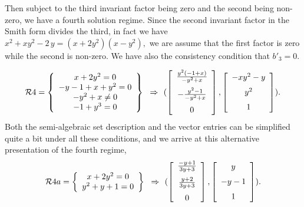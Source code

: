 \documentclass[10pt]{article}
\begin{document}
%
%
%
Then subject to the third invariant factor being zero and the second being non-zero,
we have a fourth solution regime.
Since the second invariant factor in the Smith form divides the third, in fact we have
${x}^{2}+x{y}^{2}-2\,y = (x + 2y^2)(x-{y}^{2}),$
we are assume that the first factor is zero while the second is non-zero.  
We have also the consistency condition that $b'_3 = 0$.
 
\[\RR4 = 
\breg x + 2y^2 = 0\\ -y-1+x+{y}^{2}=0\\-{y}^{2}+x\neq 0\\-1+{y}^{3}=0\ereg \implies 
(\left [\begin {array}{c} {\frac {{y}^{2}\left (-1+x\right )}{-{y}^{2}+x
}}\\\noalign{\medskip}-{\frac {{y}^{2}-1}{-{y}^{2}+x}}\\\noalign{\medskip}
0\end {array}\right ]
,
\left [\begin {array}{c} -x{y}^{2}-y\\\noalign{\medskip}{y}^{2}\\\noalign{\medskip}
1\end {array}\right ]
).
\]
Both the semi-algebraic set description and the vector entries can be simplified quite 
a bit under all these conditions, and we arrive at this alternative presentation of the
fourth regime,
\[\RR4a = 
\breg x + 2y^2 = 0\\ y^2 + y + 1 = 0\ereg \implies
(\left [\begin {array}{c} 
{\frac {-y+1}{3y+3}}\\\noalign{\medskip}
{\frac {y+2}{3y+3}}\\\noalign{\medskip}
0\end {array}\right ]
,
\left [\begin {array}{c} 
y\\\noalign{\medskip}
-y-1\\\noalign{\medskip}
1\end {array}\right ]
).
\]
\end{document}

